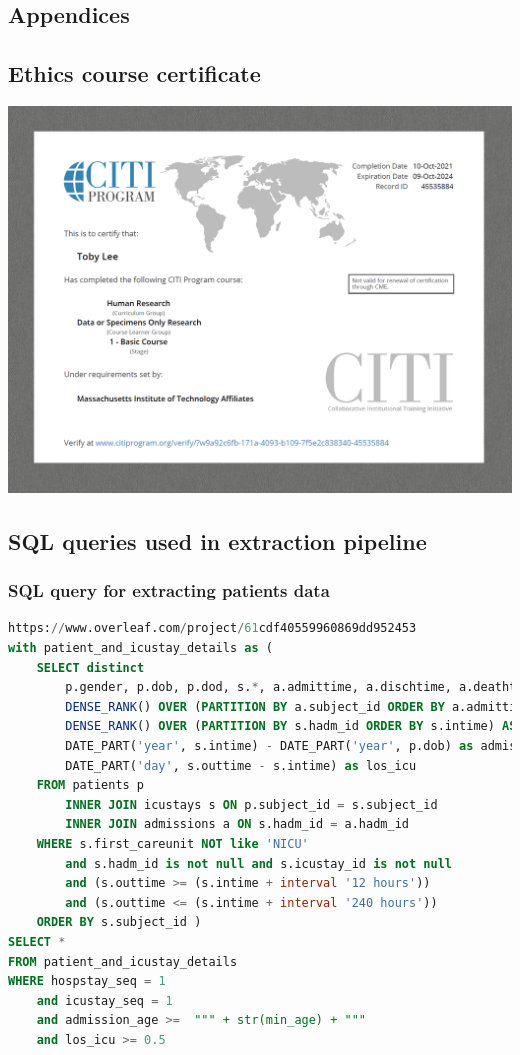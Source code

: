\documentclass{l4proj}
\begin{document}
\begin{appendices}

\chapter{Appendices}

\section{Ethics course certificate}
\label{appendix:certificate}
\includegraphics[width=\textwidth]{dissertation/Latex/images/citiCompletionReport10596230 (1).PNG}
\pagebreak

\section{SQL queries used in extraction pipeline}
\subsection{SQL query for extracting patients data}
\label{appendix:patientsSQL}
\begin{lstlisting}[language=SQL]https://www.overleaf.com/project/61cdf40559960869dd952453
with patient_and_icustay_details as (
    SELECT distinct
        p.gender, p.dob, p.dod, s.*, a.admittime, a.dischtime, a.deathtime, a.ethnicity, a.diagnosis,
        DENSE_RANK() OVER (PARTITION BY a.subject_id ORDER BY a.admittime) AS hospstay_seq,
        DENSE_RANK() OVER (PARTITION BY s.hadm_id ORDER BY s.intime) AS icustay_seq,
        DATE_PART('year', s.intime) - DATE_PART('year', p.dob) as admission_age,
        DATE_PART('day', s.outtime - s.intime) as los_icu
    FROM patients p 
        INNER JOIN icustays s ON p.subject_id = s.subject_id
        INNER JOIN admissions a ON s.hadm_id = a.hadm_id 
    WHERE s.first_careunit NOT like 'NICU'
        and s.hadm_id is not null and s.icustay_id is not null
        and (s.outtime >= (s.intime + interval '12 hours'))
        and (s.outtime <= (s.intime + interval '240 hours'))
    ORDER BY s.subject_id )
SELECT * 
FROM patient_and_icustay_details 
WHERE hospstay_seq = 1
    and icustay_seq = 1
    and admission_age >=  """ + str(min_age) + """
    and los_icu >= 0.5
    

\end{lstlisting}
\end{appendices}
\end{document}
